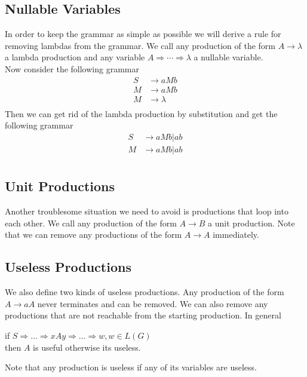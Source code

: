 \documentclass[11pt]{exam}
\begin{document}
\subsection{Nullable Variables}

In order to keep the grammar as simple as possible we will derive a rule for removing lambdas from the grammar. We call any production of the form $A \rightarrow \lambda$ a lambda production and any variable $A \Rightarrow \cdots \Rightarrow \lambda$ a nullable variable.\\

Now consider the following grammar 
\begin{align*}
S &\rightarrow aMb\\
M &\rightarrow aMb\\
M &\rightarrow \lambda\\
\end{align*}
Then we can get rid of the lambda production by substitution and get the following grammar
\begin{align*}
S &\rightarrow aMb | ab\\
M &\rightarrow aMb | ab\\
\end{align*}

\subsection{Unit Productions}
Another troublesome situation we need to avoid is productions that loop into each other. We call any production of the form
$A \rightarrow B$ a unit production. Note that we can remove any productions of the form $A \rightarrow A$ immediately.

\subsection{Useless Productions}
We also define two kinds of useless productions.
Any production of the form $A \rightarrow aA$ never terminates and can be removed. We can also remove any productions that are not reachable from the starting production. In general 

\begin{center}
if $S \Rightarrow \dots \Rightarrow xAy \Rightarrow \dots \Rightarrow w, w \in L(G)$\\
then $A$ is useful otherwise its useless.\\
\end{center}
Note that any production is useless if any of its variables are useless.\\
\end{document}
